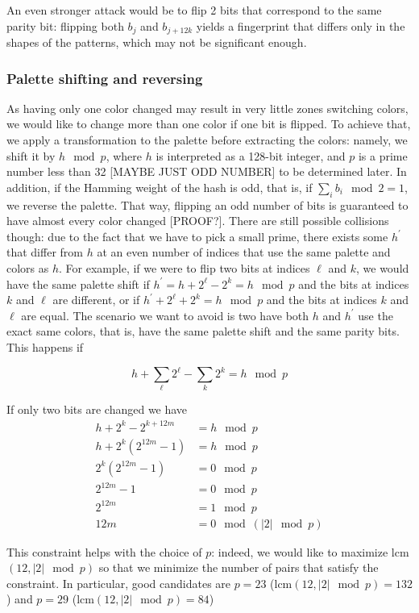 \documentclass{article}
\begin{document}
An even stronger attack would be to flip 2 bits that correspond to the same parity bit: flipping both $b_j$ and $b_{j+12k}$ yields a fingerprint that differs only in the shapes of the patterns, which may not be significant enough.

\subsubsection{Palette shifting and reversing}
As having only one color changed may result in very little zones switching colors, we would like to change more than one color if one bit is flipped. To achieve that, we apply a transformation to the palette before extracting the colors: namely, we shift it by $h \mod p$, where $h$ is interpreted as a 128-bit integer, and $p$ is a prime number less than 32 [MAYBE JUST ODD NUMBER] to be determined later. In addition, if the Hamming weight of the hash is odd, that is, if $\sum\limits_i b_i \mod 2 = 1$, we reverse the palette. That way, flipping an odd number of bits is guaranteed to have almost every color changed [PROOF?]. There are still possible collisions though: due to the fact that we have to pick a small prime, there exists some $h^\prime$ that differ from $h$ at an even number of indices that use the same palette and colors as $h$. For example, if we were to flip two bits at indices $\ell$ and $k$,  we would have the same palette shift if 
$h^\prime = h + 2^\ell - 2^k = h \mod p$ and the bits at indices $k$ and $\ell$ are different, or if $h^\prime + 2^\ell + 2^k = h \mod p$ and the bits at indices $k$ and $\ell$ are equal. The scenario we want to avoid is two have both $h$ and $h^\prime$ use the exact same colors, that is, have the same palette shift and the same parity bits.
This happens if 

$$	h + \sum\limits_\ell 2^\ell - \sum\limits_k 2^k = h \mod p $$

If only two bits are changed we have
\begin{align*}
	h + 2^k - 2^{k+12m} &= h \mod p\\
	h + 2^k(2^{12m} - 1) &= h \mod p \\
	2^k (2^{12m} - 1) &= 0 \mod p \\
	2^{12m} - 1 &= 0 \mod p \\
	2^{12m} &= 1 \mod p \\
	12m &= 0 \mod (|2| \mod p)
\end{align*}

This constraint helps with the choice of $p$: indeed, we would like to maximize lcm$(12, |2| \mod p)$ so that we minimize the number of pairs that satisfy the constraint. In particular, good candidates are $p= 23$ (lcm$(12, |2| \mod p) = 132$) and $p=29$ (lcm$(12, |2| \mod p) = 84$)
\end{document}
